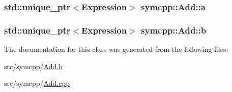 \subsubsection[{\texorpdfstring{a}{a}}]{\setlength{\rightskip}{0pt plus 5cm}std\+::unique\+\_\+ptr$<${\bf Expression}$>$ symcpp\+::\+Add\+::a\hspace{0.3cm}{\ttfamily [private]}}\hypertarget{classsymcpp_1_1Add_a9c4fbbc6d99a6625e08e141d4f2bc615}{}\label{classsymcpp_1_1Add_a9c4fbbc6d99a6625e08e141d4f2bc615}
\subsubsection[{\texorpdfstring{b}{b}}]{\setlength{\rightskip}{0pt plus 5cm}std\+::unique\+\_\+ptr$<${\bf Expression}$>$ symcpp\+::\+Add\+::b\hspace{0.3cm}{\ttfamily [private]}}\hypertarget{classsymcpp_1_1Add_af79047cdc26b03c717544e86df5590a6}{}\label{classsymcpp_1_1Add_af79047cdc26b03c717544e86df5590a6}


The documentation for this class was generated from the following files\+:\begin{DoxyCompactItemize}
\item 
src/symcpp/\hyperlink{Add_8h}{Add.\+h}\item 
src/symcpp/\hyperlink{Add_8cpp}{Add.\+cpp}\end{DoxyCompactItemize}
